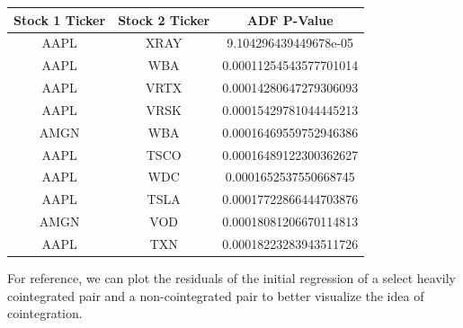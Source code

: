 \documentclass{article}
\begin{document}
\begin{spacing}{2.0}
\begin{table}[h!]
    \centering
    \begin{tabular}{|c|c|c|}
        \hline
        \textbf{Stock 1 Ticker} & \textbf{Stock 2 Ticker} & \textbf{ADF P-Value} \\ \hline
        AAPL & XRAY & 9.104296439449678e-05 \\ \hline
        AAPL & WBA & 0.00011254543577701014 \\ \hline
        AAPL & VRTX & 0.00014280647279306093 \\ \hline
        AAPL & VRSK & 0.00015429781044445213 \\ \hline
        AMGN & WBA & 0.00016469559752946386 \\ \hline
        AAPL & TSCO & 0.00016489122300362627 \\ \hline
        AAPL & WDC & 0.0001652537550668745 \\ \hline
        AAPL & TSLA & 0.00017722866444703876 \\ \hline
        AMGN & VOD & 0.00018081206670114813 \\ \hline
        AAPL & TXN & 0.00018223283943511726 \\ \hline
    \end{tabular}
\end{table}

For reference, we can plot the residuals of the initial regression of a select heavily cointegrated
pair and a non-cointegrated pair to better visualize the idea of cointegration.


\end{spacing}
\end{document}
